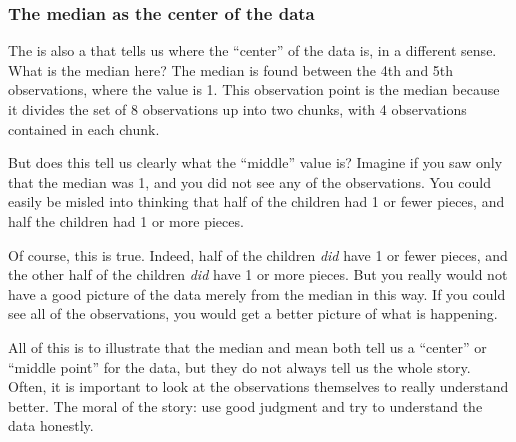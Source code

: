 \documentclass[../../../main.tex]{subfiles}
\begin{document}
\subsubsection{The median as the center of the data}

The  is also a  that tells us where the ``center'' of the data is, in a different sense. What is the median here? The median is found between the 4th and 5th observations, where the value is 1. This observation point is the median because it divides the set of 8 observations up into two chunks, with 4 observations contained in each chunk. 

But does this tell us clearly what the ``middle'' value is? Imagine if you saw only that the median was 1, and you did not see any of the observations. You could easily be misled into thinking that half of the children had 1 or fewer pieces, and half the children had 1 or more pieces. 

Of course, this is true. Indeed, half of the children \emph{did} have 1 or fewer pieces, and the other half of the children \emph{did} have 1 or more pieces. But you really would not have a good picture of the data merely from the median in this way. If you could see all of the observations, you would get a better picture of what is happening.

All of this is to illustrate that the median and mean both tell us a ``center'' or ``middle point'' for the data, but they do not always tell us the whole story. Often, it is important to look at the observations themselves to really understand better. The moral of the story: use good judgment and try to understand the data honestly.
\end{document}
